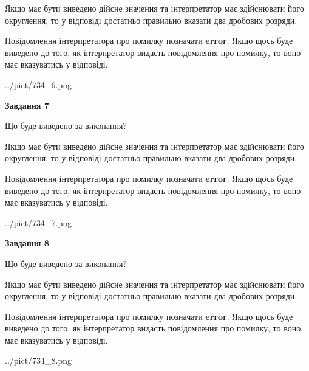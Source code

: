 \documentclass[12pt, ukrainian]{article}
\begin{document}
{\begin {Large}
Якщо має бути виведено дійсне значення та інтерпретатор має здійснювати його округлення, 
то у відповіді достатньо правильно вказати два дробових розряди.

Повідомлення інтерпретатора про помилку позначати \textbf{error}.
Якщо щось буде виведено до того, як інтерпретатор видасть повідомлення про помилку, 
то воно має вказуватись у відповіді. \par

\begin{center}
	{../pict/734_6.png}
\end{center}
\newpage

{\begin {center}\textbf{Завдання 7}\end {center}}\par
Що буде виведено за виконання? \par

Якщо має бути виведено дійсне значення та інтерпретатор має здійснювати його округлення, 
то у відповіді достатньо правильно вказати два дробових розряди.

Повідомлення інтерпретатора про помилку позначати \textbf{error}.
Якщо щось буде виведено до того, як інтерпретатор видасть повідомлення про помилку, 
то воно має вказуватись у відповіді. \par

\begin{center}
	{../pict/734_7.png}
\end{center}
\newpage

{\begin {center}\textbf{Завдання 8}\end {center}}\par
Що буде виведено за виконання? \par

Якщо має бути виведено дійсне значення та інтерпретатор має здійснювати його округлення, 
то у відповіді достатньо правильно вказати два дробових розряди.

Повідомлення інтерпретатора про помилку позначати \textbf{error}.
Якщо щось буде виведено до того, як інтерпретатор видасть повідомлення про помилку, 
то воно має вказуватись у відповіді. \par

\begin{center}
	{../pict/734_8.png}
\end{center}
\newpage


\end{Large}}
\end{document}
